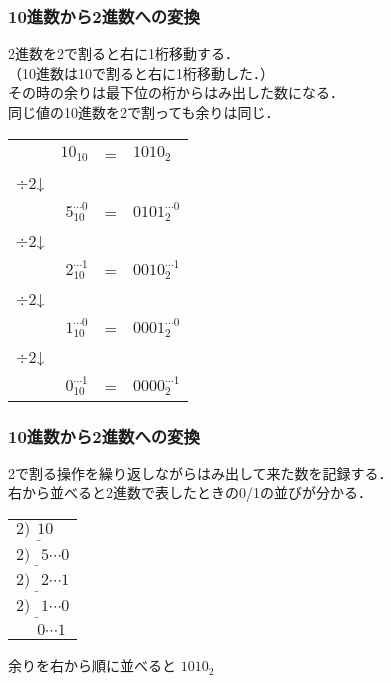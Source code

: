 \documentclass{beamer}                 %
\begin{document}
\begin{frame}
  \frametitle{10進数から2進数への変換}

  2進数を2で割ると右に1桁移動する．\\
  （10進数は10で割ると右に1桁移動した．）\\
  その時の余りは最下位の桁からはみ出した数になる．\\
  同じ値の10進数を2で割っても余りは同じ．

\begin{center}
\begin{tabular}{l r l l }
          & $10_{10}$ & = & $1010_2$                       \\
$\div 2$↓ &                   &                            \\
          & $5_{10}^{\cdots 0}$  & = & $0101_2^{\cdots 0}$ \\
$\div 2$↓ &                    &                           \\
          & $2_{10}^{\cdots 1}$  & = & $0010_2^{\cdots 1}$ \\
$\div 2$↓ &                    &                           \\
          & $1_{10}^{\cdots 0}$  & = & $0001_2^{\cdots 0}$ \\
$\div 2$↓ &                    &                           \\
          & $0_{10}^{\cdots 1}$  & = & $0000_2^{\cdots 1}$ \\
\end{tabular}
\end{center}
\end{frame}

\begin{frame}
  \frametitle{10進数から2進数への変換}
2で割る操作を繰り返しながらはみ出して来た数を記録する．\\
右から並べると2進数で表したときの0/1の並びが分かる．

\begin{center}
\begin{minipage}{0.5\columnwidth}
\begin{flushright}
\begin{tabular}{l}
$2 \underline{) ~~10 } $\\
$2 \underline{) ~~~5  } {\cdots 0}$ \\
$2 \underline{) ~~~2  } {\cdots 1}$ \\
$2 \underline{) ~~~1  } {\cdots 0}$ \\
$~~            ~~~~0    {\cdots 1}$
\end{tabular}
\end{flushright}
\end{minipage}
\begin{minipage}{0.4\columnwidth}
余りを右から順に並べると $1010_2$
\end{minipage}
\end{center}
\end{frame}
\end{document}
